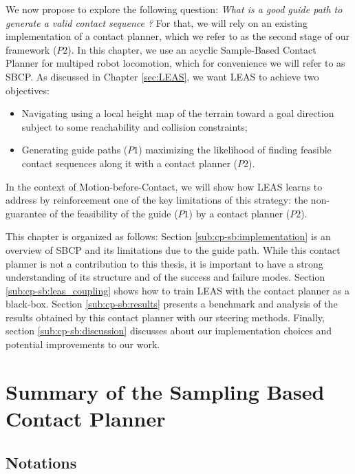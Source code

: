 We now propose to explore the following question: \textit{What is a good guide path to generate a valid contact sequence ?}
For that, we will rely on an existing implementation of a contact planner, which we refer to as the second stage of our framework ($P2$). 
In this chapter, we use an acyclic Sample-Based Contact Planner \cite{AcyclicCP} for multiped robot locomotion, which for convenience we will refer to as SBCP.
As discussed in Chapter \ref{sec:LEAS}, we want LEAS to achieve two objectives:
\begin{itemize}
    \item Navigating using a local height map of the terrain toward a goal direction subject to some reachability and collision constraints;
    \item Generating guide paths ($P1$) maximizing the likelihood of finding feasible contact sequences along it with a contact planner ($P2$).
\end{itemize}
In the context of Motion-before-Contact, we will show how LEAS learns to address by reinforcement one of the key limitations of this strategy: the non-guarantee of the feasibility of the guide ($P1$) by a contact planner ($P2$).

This chapter is organized as follows:
Section \ref{sub:cp-sb:implementation} is an overview of SBCP and its limitations due to the guide path. While this contact planner is not a contribution to this thesis, it is important to have a strong understanding of its structure and of the success and failure modes.
Section \ref{sub:cp-sb:leas_coupling} shows how to train LEAS with the contact planner as a black-box. 
Section \ref{sub:cp-sb:results} presents a benchmark and analysis of the results obtained by this contact planner with our steering methods.
Finally, section \ref{sub:cp-sb:discussion} discusses about our implementation choices and potential improvements to our work.


\section{Summary of the Sampling Based Contact Planner \label{sub:cp-sb:implementation}}

\subsection{Notations}

